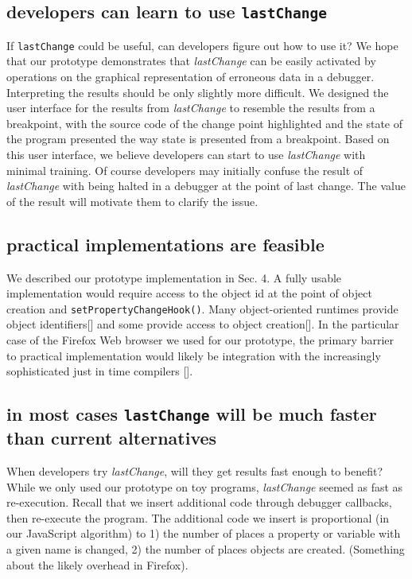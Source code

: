 \documentclass[preprint]{sigplanconf}
\begin{document}
\subsection{developers can learn to use \protect\texttt{lastChange}}

If \texttt{lastChange} could be useful, can developers figure out how
to use it? We hope that our prototype demonstrates that
\textit{lastChange} can be easily activated by operations on the
graphical representation of erroneous data in a debugger. Interpreting
the results should be only slightly more difficult. We designed the
user interface for the results from \textit{lastChange} to resemble
the results from a breakpoint, with the source code of the change
point highlighted and the state of the program presented the way state
is presented from a breakpoint. Based on this user interface, we
believe developers can start to use \textit{lastChange} with minimal
training. Of course developers may initially confuse the result of
\textit{lastChange} with being halted in a debugger at the point of
last change. The value of the result will motivate them to clarify the
issue.

\subsection{practical implementations are feasible}

We described our prototype implementation in Sec. 4. A fully usable
implementation would require access to the object id at the point of
object creation and \texttt{setPropertyChangeHook()}. Many
object-oriented runtimes provide object identifiers[] and some
provide access to object creation[]. In the particular case of
the Firefox Web browser we used for our prototype, the primary barrier
to practical implementation would likely be integration with the
increasingly sophisticated just in time compilers []. 

\subsection{in most cases \protect\texttt{lastChange} will be much faster than current alternatives}

When developers try \textit{lastChange}, will they get results fast
enough to benefit? While we only used our prototype on toy programs,
\textit{lastChange} seemed as fast as re-execution.  Recall that we
insert additional code through debugger callbacks, then re-execute the
program. The additional code we insert is proportional (in our
JavaScript algorithm) to 1) the number of places a property or
variable with a given name is changed, 2) the number of places objects
are created. (Something about the likely overhead in Firefox).
\end{document}
